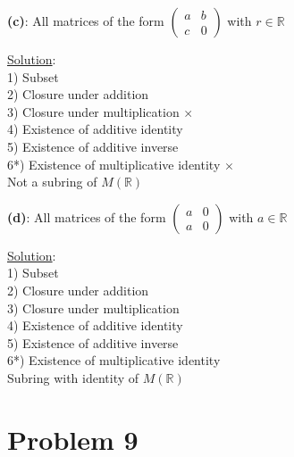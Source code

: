 \documentclass{article} %
\begin{document}
\begin{addmargin}[1em]{0em}
\textbf{(c)}: All matrices of the form $\left( \begin{smallmatrix} a & b \\ c & 0 \end{smallmatrix} \right)$ with $r \in \mathbb{R}$
\begin{addmargin}[1em]{0em}
\underline{Solution}:
\\ 1) Subset \checkmark
\\ 2) Closure under addition \checkmark
\\ 3) Closure under multiplication $\times$
\\ 4) Existence of additive identity \checkmark
\\ 5) Existence of additive inverse \checkmark
\\ 6*) Existence of multiplicative identity $\times$
\\ Not a subring of $M(\mathbb{R})$
\begin{addmargin}[1em]{0em}
\end{addmargin}
\end{addmargin}

\textbf{(d)}: All matrices of the form $\left( \begin{smallmatrix} a & 0 \\ a & 0 \end{smallmatrix} \right)$ with $a \in \mathbb{R}$
\begin{addmargin}[1em]{0em}
\underline{Solution}:
\\ 1) Subset \checkmark
\\ 2) Closure under addition \checkmark
\\ 3) Closure under multiplication \checkmark
\\ 4) Existence of additive identity \checkmark
\\ 5) Existence of additive inverse \checkmark
\\ 6*) Existence of multiplicative identity \checkmark
\\Subring with identity of $M(\mathbb{R})$

\begin{addmargin}[1em]{0em}
\end{addmargin}
\end{addmargin}
 
\end{addmargin}

\newpage

\section*{Problem 9}
\end{document}
